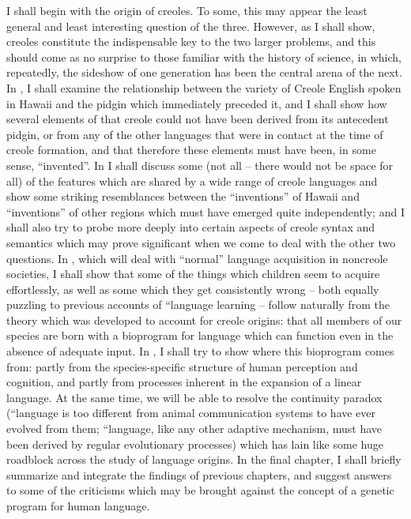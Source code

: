 I shall begin with the origin of creoles. To some, this may appear the least general and least interesting question of the three. However, as I shall show, creoles constitute the indispensable key to the two larger problems, and this should come as no surprise to those familiar with the history of science, in which, repeatedly, the sideshow of one generation has been the central arena of the next. In , I shall examine the relationship between the variety of Creole English spoken in Hawaii and the pidgin which immediately preceded it, and I shall show how several elements of that creole could not have been derived from its antecedent pidgin, or from any of the other languages that were in contact at the time of creole formation, and that therefore these elements must have been, in some sense, ``invented''. In  I shall discuss some (not all -- there would not be space for all) of the features which are shared by a wide range of creole languages and show some striking resemblances between the ``inventions'' of Hawaii and ``inventions'' of other regions which must have emerged quite independently; and I shall also try to probe more deeply into certain aspects of creole syntax and semantics which may prove signifi\-cant when we come to deal with the other two questions. In , which will deal with ``normal'' language acquisition in noncreole societies, I shall show that some of the things which children seem to acquire effortlessly, as well as some which they get consistently wrong -- both equally puzzling to previous accounts of ``language learning{\textquotedbl} -- follow naturally from the theory which was developed to account for creole origins: that all members of our species are born with a bio\-program for language which can function even in the absence of ade\-quate input. In , I shall try to show where this bioprogram comes from: partly from the species-specific structure of human perception and cognition, and partly from processes inherent in the expansion of a linear language. At the same time, we will be able to resolve the continuity paradox (``language is too different from animal communication systems to have ever evolved from them{\textquotedbl}; ``language, like any other adaptive mechanism, must have been derived by regular evolutionary processes{\textquotedbl}) which has lain like some huge roadblock across the study of language origins. In the final chapter, I shall briefly summarize and integrate the findings of previous chapters, and suggest answers to some of the criticisms which may be brought against the concept of a genetic program for human language.
